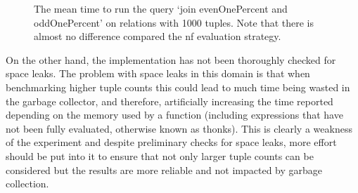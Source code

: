 \begin{figure}[p]
    \centering
    
    \caption{The mean time to run the query `join evenOnePercent and oddOnePercent' on
    relations with 1000 tuples. Note that there is almost no difference compared
the nf evaluation strategy.}
    \label{fig:evaluation:nf-whnf-join-evenOnePercent-and-oddOnePercent}
\end{figure}

On the other hand, the implementation has not been thoroughly checked for space
leaks. The problem with space leaks in this domain is that when benchmarking
higher tuple counts this could lead to much time being wasted in the garbage
collector, and therefore, artificially increasing the time reported depending on
the memory used by a function (including expressions that have not been fully
evaluated, otherwise known as thonks). This is clearly a weakness of the
experiment and despite preliminary checks for space leaks, more effort should be
put into it to ensure that not only larger tuple counts can be considered but
the results are more reliable and not impacted by garbage collection.
